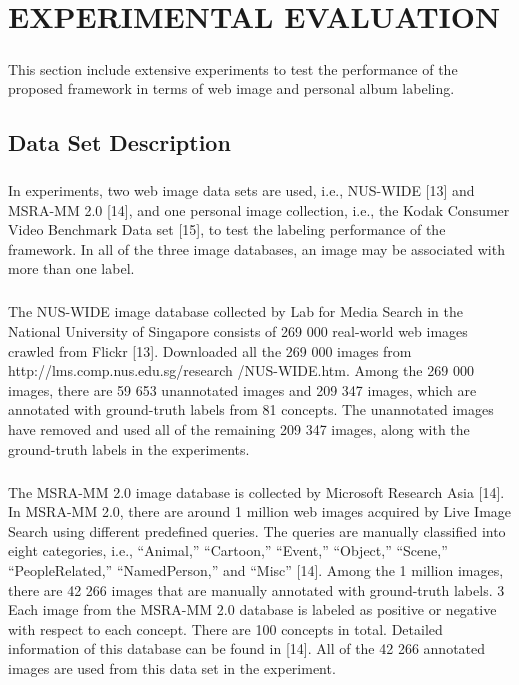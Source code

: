 \documentclass[a4paper,11pt]{report}
\begin{document}
\chapter{EXPERIMENTAL EVALUATION
}
\paragraph{}This section include extensive experiments to test the
performance of the proposed framework in terms of web image
and personal album labeling.
\section{Data Set Description
}
\paragraph{}In  experiments,  two web image data
sets are used, i.e., NUS-WIDE [13] and MSRA-MM 2.0 [14], and one
personal image collection, i.e., the Kodak Consumer Video
Benchmark Data set [15], to test the labeling performance of
the framework. In all of the three image databases, an image
may be associated with more than one label.
\paragraph{}
The NUS-WIDE image database collected by Lab for
Media Search in the National University of Singapore consists
of 269 000 real-world web images crawled from Flickr
[13]. Downloaded all the 269 000 images from
http://lms.comp.nus.edu.sg/research /NUS-WIDE.htm. Among
the 269 000 images, there are 59 653 unannotated images and
209 347 images, which are annotated with ground-truth labels
from 81 concepts.   The unannotated images have removed
and used all of the remaining 209 347 images, along with the
ground-truth labels in the experiments.
\paragraph{}
The MSRA-MM 2.0 image database is collected by Microsoft
Research Asia [14]. In MSRA-MM 2.0, there are
around 1 million web images acquired by Live Image Search
using different predefined queries. The queries are manually
classified into eight categories, i.e., “Animal,” “Cartoon,”
“Event,” “Object,” “Scene,” “PeopleRelated,” “NamedPerson,”
and “Misc” [14]. Among the 1 million images, there are 42 266
images that are manually annotated with ground-truth labels. 3
Each image from the MSRA-MM 2.0 database is labeled as
positive or negative with respect to each concept. There are 100
concepts in total. Detailed information of this database can be
found in [14]. All of the 42 266 annotated images are used
from this data set in the experiment.
\end{document}
